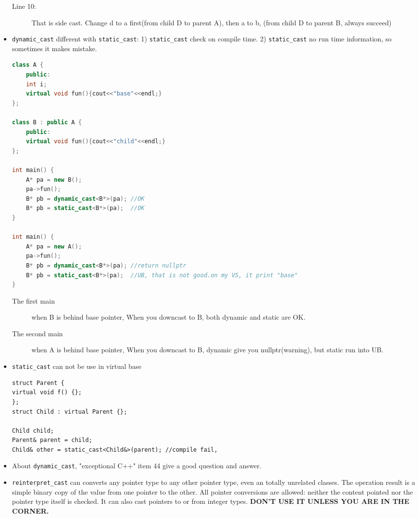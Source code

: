 \documentclass[a4paper,11pt,twoside]{book}
\begin{document}
\begin{itemize}
\begin{description}
	\item[Line 10:] That is side cast. Change d to a first(from child D to parent A), then a to b, (from child D to parent B, always succeed)
	
\end{description}
	
	\item \texttt{dynamic\_cast} different with \texttt{static\_cast}: 1) \texttt{static\_cast} check on compile time. 2) \texttt{static\_cast} no run time information, so sometimes it makes mistake.
\begin{lstlisting}[frame=single, language=c++, mathescape=true]
class A {
	public:
	int i;
	virtual void fun(){cout<<"base"<<endl;}
};

class B : public A {
	public:
	virtual void fun(){cout<<"child"<<endl;}
};

int main() {
	A* pa = new B();
	pa->fun();
	B* pb = dynamic_cast<B*>(pa); //OK
	B* pb = static_cast<B*>(pa);  //OK	
}

int main() {
	A* pa = new A();
	pa->fun();
	B* pb = dynamic_cast<B*>(pa); //return nullptr
	B* pb = static_cast<B*>(pa);  //UB, that is not good.on my VS, it print "base"
}
\end{lstlisting}
\begin{description}
	\item[The first main] when B is behind base pointer, When you downcast to B, both dynamic and static are OK.
	\item[The second main]  when A is behind base pointer, When you downcast to B, dynamic give you nullptr(warning), but static run into UB.	
\end{description}

	\item \texttt{static\_cast} can not be use in virtual base 
\begin{lstlisting}[numbers = none]
struct Parent {
virtual void f() {};
};
struct Child : virtual Parent {};

Child child;
Parent& parent = child;
Child& other = static_cast<Child&>(parent); //compile fail, 
\end{lstlisting}

	\item About \texttt{dynamic\_cast}, "exceptional C++" item 44 give a good question and answer.
	
	\item \texttt{reinterpret\_cast} can converts any pointer type to any other pointer type, even an totally unrelated classes. The operation result is a simple binary copy of the value from one pointer to the other. All pointer conversions are allowed: neither the content pointed nor the pointer type itself is checked. It can also cast pointers to or from integer types. \textbf{DON'T USE IT UNLESS YOU ARE IN THE CORNER.}
	

\end{itemize}
\end{document}
